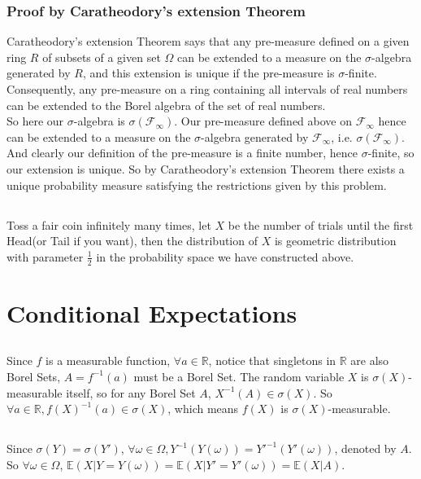 \documentclass[12pt,letterpaper]{article}
\begin{document}
\subsubsection{Proof by Caratheodory's extension Theorem}
Caratheodory's extension Theorem says that any pre-measure defined on a given ring $R$ of subsets of a given set $\Omega$ can be extended to a measure on the $\sigma$-algebra generated by $R$, and this extension is unique if the pre-measure is $\sigma$-finite. Consequently, any pre-measure on a ring containing all intervals of real numbers can be extended to the Borel algebra of the set of real numbers.\\
So here our $\sigma$-algebra is $\sigma(\mathcal{F}_{\infty})$. Our pre-measure defined above on $\mathcal{F}_{\infty}$ hence can be extended to a measure on the $\sigma$-algebra generated by $\mathcal{F}_{\infty}$, i.e. $\sigma(\mathcal{F}_{\infty})$. And clearly our definition of the pre-measure is  a finite number, hence $\sigma$-finite, so our extension is unique. So by Caratheodory's extension Theorem there exists a unique probability measure satisfying the restrictions given by this problem.
\subsection{}
Toss a fair coin infinitely many times, let $X$ be the number of trials until the first Head(or Tail if you want), then the distribution of $X$ is geometric distribution with parameter $\frac{1}{2}$ in the probability space we have constructed above.
\section{Conditional Expectations}
\subsection{}
Since $f$ is a measurable function, $\forall a\in\mathbb{R}$, notice that singletons in $\mathbb{R}$ are also Borel Sets, $A=f^{-1}(a)$ must be a Borel Set. The random variable $X$ is $\sigma(X)$-measurable itself, so for any Borel Set $A$, $X^{-1}(A)\in\sigma(X)$. So $\forall a\in\mathbb{R}, f(X)^{-1}(a)\in\sigma(X)$, which means $f(X)$ is $\sigma(X)$-measurable.
\subsection{}
Since $\sigma(Y)=\sigma(Y')$, $\forall \omega\in\Omega, Y^{-1}(Y(\omega))=Y'^{-1}(Y'(\omega))$, denoted by $A$. So $\forall\omega\in\Omega$, $\mathbb{E}(X|Y=Y(\omega))=\mathbb{E}(X|Y'=Y'(\omega))=\mathbb{E}(X|A)$.
\end{document}
